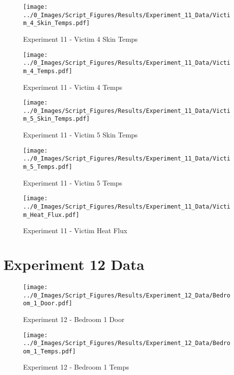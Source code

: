 	\begin{figure}[H]
		\centering
		\texttt{[image: ../0\_Images/Script\_Figures/Results/Experiment\_11\_Data/Victim\_4\_Skin\_Temps.pdf]}
		\caption[]{Experiment 11 - Victim 4 Skin Temps}
	\end{figure}
 
	\clearpage

	\begin{figure}[H]
		\centering
		\texttt{[image: ../0\_Images/Script\_Figures/Results/Experiment\_11\_Data/Victim\_4\_Temps.pdf]}
		\caption[]{Experiment 11 - Victim 4 Temps}
	\end{figure}
 

	\begin{figure}[H]
		\centering
		\texttt{[image: ../0\_Images/Script\_Figures/Results/Experiment\_11\_Data/Victim\_5\_Skin\_Temps.pdf]}
		\caption[]{Experiment 11 - Victim 5 Skin Temps}
	\end{figure}
 
	\clearpage

	\begin{figure}[H]
		\centering
		\texttt{[image: ../0\_Images/Script\_Figures/Results/Experiment\_11\_Data/Victim\_5\_Temps.pdf]}
		\caption[]{Experiment 11 - Victim 5 Temps}
	\end{figure}
 

	\begin{figure}[H]
		\centering
		\texttt{[image: ../0\_Images/Script\_Figures/Results/Experiment\_11\_Data/Victim\_Heat\_Flux.pdf]}
		\caption[]{Experiment 11 - Victim Heat Flux}
	\end{figure}
 
	\clearpage

\clearpage		\large
\section{Experiment 12 Data} \label{App:Exp12Results} 

	\begin{figure}[H]
		\centering
		\texttt{[image: ../0\_Images/Script\_Figures/Results/Experiment\_12\_Data/Bedroom\_1\_Door.pdf]}
		\caption[]{Experiment 12 - Bedroom 1 Door}
	\end{figure}
 

	\begin{figure}[H]
		\centering
		\texttt{[image: ../0\_Images/Script\_Figures/Results/Experiment\_12\_Data/Bedroom\_1\_Temps.pdf]}
		\caption[]{Experiment 12 - Bedroom 1 Temps}
	\end{figure}
 
